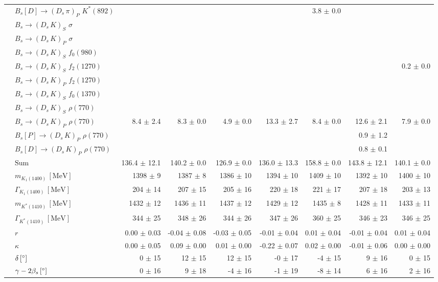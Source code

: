 \begin{tabular}{l l  r  r  r  r  r  r  r  }
 & $B_s[D] \to ( D_s \, \pi)_{P} \, \, K^{*}(892)$ &  &  &  &  & 3.8 $\pm$ 0.0 &  &  \\ 
 & $B_s \to ( D_s \, K)_{S} \, \, \sigma$ &  &  &  &  &  &  &  \\ 
 & $B_s \to ( D_s \, K)_{P} \, \, \sigma$ &  &  &  &  &  &  &  \\ 
 & $B_s \to ( D_s \, K)_{S} \, \, f_0(980)$ &  &  &  &  &  &  &  \\ 
 & $B_s \to ( D_s \, K)_{S} \, \, f_2(1270)$ &  &  &  &  &  &  & 0.2 $\pm$ 0.0 \\ 
 & $B_s \to ( D_s \, K)_{P} \, \, f_2(1270)$ &  &  &  &  &  &  &  \\ 
 & $B_s \to ( D_s \, K)_{S} \, \, f_0(1370)$ &  &  &  &  &  &  &  \\ 
 & $B_s \to ( D_s \, K)_{S} \, \, \rho(770)$ &  &  &  &  &  &  &  \\ 
 & $B_s \to ( D_s \, K)_{P} \, \, \rho(770)$ & 8.4 $\pm$ 2.4 & 8.3 $\pm$ 0.0 & 4.9 $\pm$ 0.0 & 13.3 $\pm$ 2.7 & 8.4 $\pm$ 0.0 & 12.6 $\pm$ 2.1 & 7.9 $\pm$ 0.0 \\ 
 & $B_s[P] \to ( D_s \, K)_{P} \, \, \rho(770)$ &  &  &  &  &  & 0.9 $\pm$ 1.2 &  \\ 
 & $B_s[D] \to ( D_s \, K)_{P} \, \, \rho(770)$ &  &  &  &  &  & 0.8 $\pm$ 0.1 &  \\ 
 & $\text{Sum}$ & 136.4 $\pm$ 12.1 & 140.2 $\pm$ 0.0 & 126.9 $\pm$ 0.0 & 136.0 $\pm$ 13.3 & 158.8 $\pm$ 0.0 & 143.8 $\pm$ 12.1 & 140.1 $\pm$ 0.0 \\ 
\hline
 & $m_{K_1(1400)} \, [\text{MeV}]$ & 1398 $\pm$ 9 & 1387 $\pm$ 8 & 1386 $\pm$ 10 & 1394 $\pm$ 10 & 1409 $\pm$ 10 & 1392 $\pm$ 10 & 1400 $\pm$ 10 \\ 
 & $\Gamma_{K_1(1400)} \, [\text{MeV}]$ & 204 $\pm$ 14 & 207 $\pm$ 15 & 205 $\pm$ 16 & 220 $\pm$ 18 & 221 $\pm$ 17 & 207 $\pm$ 18 & 203 $\pm$ 13 \\ 
 & $m_{K^{*}(1410)} \, [\text{MeV}]$ & 1432 $\pm$ 12 & 1436 $\pm$ 11 & 1437 $\pm$ 12 & 1429 $\pm$ 12 & 1435 $\pm$ 8 & 1428 $\pm$ 11 & 1433 $\pm$ 11 \\ 
 & $\Gamma_{K^{*}(1410)} \, [\text{MeV}]$ & 344 $\pm$ 25 & 348 $\pm$ 26 & 344 $\pm$ 26 & 347 $\pm$ 26 & 360 $\pm$ 25 & 346 $\pm$ 23 & 346 $\pm$ 25 \\ 
 & $r$ & 0.00 $\pm$ 0.03 & -0.04 $\pm$ 0.08 & -0.03 $\pm$ 0.05 & -0.01 $\pm$ 0.04 & 0.01 $\pm$ 0.04 & -0.01 $\pm$ 0.04 & 0.01 $\pm$ 0.04 \\ 
 & $\kappa$ & 0.00 $\pm$ 0.05 & 0.09 $\pm$ 0.00 & 0.01 $\pm$ 0.00 & -0.22 $\pm$ 0.07 & 0.02 $\pm$ 0.00 & -0.01 $\pm$ 0.06 & 0.00 $\pm$ 0.00 \\ 
 & $\delta \, [^{\circ}]$ & 0 $\pm$ 15 & 12 $\pm$ 15 & 12 $\pm$ 15 & -0 $\pm$ 17 & -4 $\pm$ 15 & 9 $\pm$ 16 & 0 $\pm$ 15 \\ 
 & $\gamma - 2 \beta_{s} \, [^{\circ}]$ & 0 $\pm$ 16 & 9 $\pm$ 18 & -4 $\pm$ 16 & -1 $\pm$ 19 & -8 $\pm$ 14 & 6 $\pm$ 16 & 2 $\pm$ 16 \\ 
\hline
\hline
\end{tabular}
